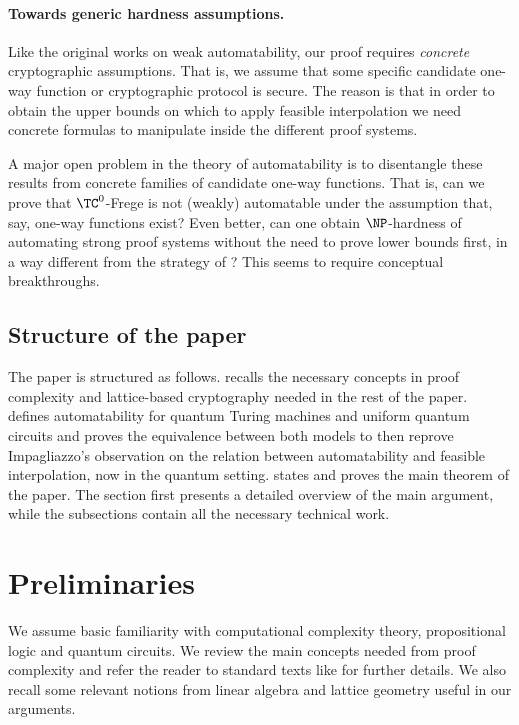 \documentclass[11pt]{article}
\theoremstyle{definition}
\theoremstyle{plain}
\theoremstyle{remark}
\begin{document}
\paragraph{Towards generic hardness assumptions.}
Like the original works on weak automatability, our proof requires \emph{concrete} cryptographic assumptions. That is, we assume that some specific candidate one-way function or cryptographic protocol is secure. The reason is that in order to obtain the upper bounds on which to apply feasible interpolation we need concrete formulas to manipulate inside the different proof systems.

A major open problem in the theory of automatability is to disentangle these results from concrete families of candidate one-way functions. That is, can we prove that $\TC^0$-Frege is not (weakly) automatable under the assumption that, say, one-way functions exist? Even better, can one obtain $\NP$-hardness of automating strong proof systems without the need to prove lower bounds first, in a way different from the strategy of \citeauthor{AM20} \cite{AM20}? This seems to require conceptual breakthroughs. 

\subsection*{Structure of the paper}
The paper is structured as follows.  recalls the necessary concepts in proof complexity and lattice-based cryptography needed in the rest of the paper.  defines automatability for quantum Turing machines and uniform quantum circuits and proves the equivalence between both models to then reprove Impagliazzo's observation on the relation between automatability and feasible interpolation, now in the quantum setting.  states and proves the main theorem of the paper. The section first presents a detailed overview of the main argument, while the subsections contain all the necessary technical work.

\section{Preliminaries}
\label{sec:prelim}

We assume basic familiarity with computational complexity theory, propositional logic and quantum circuits. We review the main concepts needed from proof complexity and refer the reader to standard texts like \cite{krajicekBOOK} for further details. We also recall some relevant notions from linear algebra and lattice geometry useful in our arguments.
\end{document}

